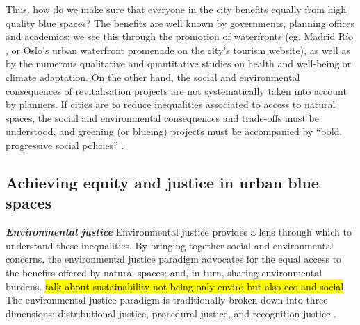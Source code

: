 \documentclass{article}
\newcommand{\bisection}[1]{\textbf{\textit{#1}}}
\begin{document}
Thus, how do we make sure that everyone in the city benefits equally from high quality blue spaces? The benefits are well known by governments, planning offices and academics; we see this through the promotion of waterfronts (eg. Madrid Río \parencite{madridrio}, or Oslo's urban waterfront promenade \parencite{visitoslo} on the city's tourism website), as well as by the numerous qualitative and quantitative studies on health and well-being or climate adaptation.
On the other hand, the social and environmental consequences of revitalisation projects are not systematically taken into account by planners. If cities are to reduce inequalities associated to access to natural spaces, the social and environmental consequences and trade-offs must be understood, and greening (or blueing) projects must be accompanied by ``bold, progressive social policies'' \parencite{anguelovski2021green}.




\subsection{Achieving equity and justice in urban blue spaces}

\bisection{Environmental justice}
Environmental justice provides a lens through which to understand these inequalities. By bringing together social and environmental concerns, the environmental justice paradigm advocates for the equal access to the benefits offered by natural spaces; and, in turn, sharing environmental burdens. 
\hl{talk about sustainability not being only enviro but also eco and social}
The environmental justice paradigm is traditionally broken down into three dimensions: distributional justice, procedural justice, and recognition justice \parencite{todo:cite schlosberg}.
\end{document}
